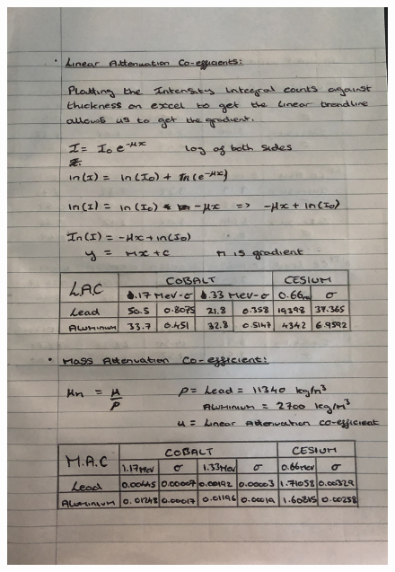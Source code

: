 \documentclass[12pt]{article}
\begin{document}
\begin{figure}[H]
\centering
\includegraphics[scale=0.17]{Images/IMG_0336.JPG}
\end{figure}
\newpage
\end{document}
